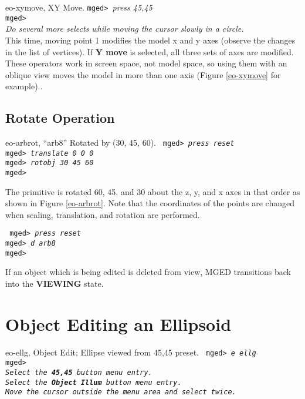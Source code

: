 \mfig eo-xymove, XY Move.
\noindent
{\tt mged> }{\em press 45,45}\\
{\tt mged> }\\
{\em Do several more selects while moving the cursor slowly in a circle.}\\

   This time, moving point 1 modifies the model x and y axes (observe the
changes in the list of vertices).  If {\bf Y move} is selected, all
three sets of axes are modified.  These operators work in screen space,
not model space, so using them with an oblique view moves the model in
more than one axis (Figure \ref{eo-xymove} for example).. 


\subsection{Rotate Operation}

\mfig eo-arbrot, ``arb8'' Rotated by (30, 45, 60).
\noindent
{\tt
mged> {\em press reset}\\
mged> {\em translate 0 0 0}\\
mged> {\em rotobj 30 45 60}\\
mged>\\
}

The primitive is rotated 60, 45, and 30 about the z, y, and x axes in
that order as shown in Figure \ref{eo-arbrot}.
Note that the coordinates of the points are changed when scaling,
translation, and rotation are performed.

\noindent
{\tt
mged> {\em press reset}\\
mged> {\em d arb8}\\
mged>\\
}

If an object which is being edited is deleted from view, MGED transitions
back into the {\bf VIEWING} state.

\section{Object Editing an Ellipsoid}

\mfig eo-ellg, Object Edit; Ellipse viewed from 45,45 preset.
\noindent
{\tt
mged> {\em e ellg}\\
mged>\\
{\em Select the {\bf 45,45} button menu entry.}\\
{\em Select the {\bf Object Illum} button menu entry.}\\
{\em Move the cursor outside the menu area and select twice.}\\
}

